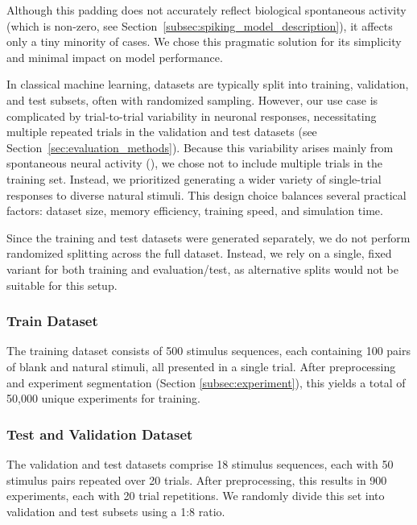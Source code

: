 Although this padding does not accurately reflect biological spontaneous activity (which is non-zero, see Section~\ref{subsec:spiking_model_description}), it affects only a tiny minority of cases. We chose this pragmatic solution for its simplicity and minimal impact on model performance.

In classical machine learning, datasets are typically split into training, validation, and test subsets, often with randomized sampling. However, our use case is complicated by trial-to-trial variability in neuronal responses, necessitating multiple repeated trials in the validation and test datasets (see Section~\ref{sec:evaluation_methods}). Because this variability arises mainly from spontaneous neural activity (\citet{antolik2024comprehensive}), we chose not to include multiple trials in the training set. Instead, we prioritized generating a wider variety of single-trial responses to diverse natural stimuli. This design choice balances several practical factors: dataset size, memory efficiency, training speed, and simulation time.

Since the training and test datasets were generated separately, we do not perform randomized splitting across the full dataset. Instead, we rely on a single, fixed variant for both training and evaluation/test, as alternative splits would not be suitable for this setup.

\subsubsection{Train Dataset}
\label{subsubsec:train_dataset}

The training dataset consists of 500 stimulus sequences, each containing 100 pairs of blank and natural stimuli, all presented in a single trial. After preprocessing and experiment segmentation (Section \ref{subsec:experiment}), this yields a total of 50,000 unique experiments for training.

\subsubsection{Test and Validation Dataset}
\label{subsubsec:test_dataset}

The validation and test datasets comprise 18 stimulus sequences, each with 50 stimulus pairs repeated over 20 trials. After preprocessing, this results in 900 experiments, each with 20 trial repetitions. We randomly divide this set into validation and test subsets using a 1:8 ratio.

